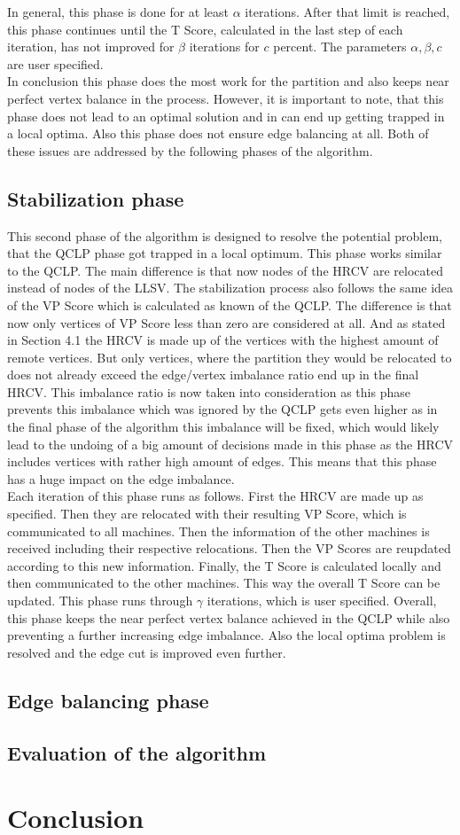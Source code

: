 \documentclass[acmsmall,nonacm,screen,review]{acmart}
\begin{document}
In general, this phase is done for at least $\alpha$ iterations. After that limit is reached, this phase continues until the T Score, calculated in the last step of each iteration, has not improved for $\beta$ iterations for $c$ percent. The parameters $\alpha,\beta,c$ are user specified.\\
In conclusion this phase does the most work for the partition and also keeps near perfect vertex balance in the process. However, it is important to note, that this phase does not lead to an optimal solution and in can end up getting trapped in a local optima. Also this phase does not ensure edge balancing at all. Both of these issues are addressed by the following phases of the algorithm.
\subsection{Stabilization phase}
This second phase of the algorithm is designed to resolve the potential problem, that the QCLP phase got trapped in a local optimum. This phase works similar to the QCLP. The main difference is that now nodes of the HRCV are relocated instead of nodes of the LLSV. The stabilization process also follows the same idea of the VP Score which is calculated as known of the QCLP. The difference is that now only vertices of VP Score less than zero are considered at all. And as stated in Section 4.1 the HRCV is made up of the vertices with the highest amount of remote vertices. But only vertices, where the partition they would be relocated to does not already exceed the edge/vertex imbalance ratio end up in the final HRCV. This imbalance ratio is now taken into consideration as this phase prevents this imbalance which was ignored by the QCLP gets even higher as in the final phase of the algorithm this imbalance will be fixed, which would likely lead to the undoing of a big amount of decisions made in this phase as the HRCV includes vertices with rather high amount of edges. This means that this phase has a huge impact on the edge imbalance.\\
Each iteration of this phase runs as follows. First the HRCV are made up as specified. Then they are relocated with their resulting VP Score, which is communicated to all machines. Then the information of the other machines is received including their respective relocations. Then the VP Scores are reupdated according to this new information. Finally, the T Score is calculated locally and then communicated to the other machines. This way the overall T Score can be updated. This phase runs through $\gamma$ iterations, which is user specified.
Overall, this phase keeps the near perfect vertex balance achieved in the QCLP while also preventing a further increasing edge imbalance. Also the local optima problem is resolved and the edge cut is improved even further.
\subsection{Edge balancing phase}

\subsection{Evaluation of the algorithm}
\section{Conclusion}


\end{document}
